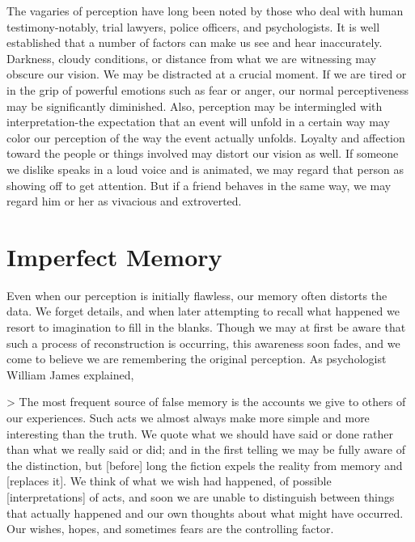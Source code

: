 \documentclass{book}
\begin{document}
The vagaries of perception have long been noted by those who deal with human testimony-notably, trial lawyers, police officers, and psychologists.  It is well established that a number of factors can make us see and hear inaccurately. Darkness, cloudy conditions, or distance from what we are witnessing may obscure our vision. We may be distracted at a crucial moment. If we are tired or in the grip of powerful emotions such as fear or anger, our normal perceptiveness may be significantly diminished.  Also, perception may be intermingled with interpretation-the expectation that an event will unfold in a certain way may color our perception of the way the event actually unfolds. Loyalty and affection toward the people or things involved may distort our vision as well. If someone we dislike speaks in a loud voice and is animated, we may regard that person as showing off to get attention. But if a friend behaves in the same way, we may regard him or her as vivacious and extroverted.

\section{Imperfect Memory}

Even when our perception is initially flawless, our memory often distorts the data. We forget details, and when later attempting to recall what happened we resort to imagination to fill in the blanks. Though we may at first be aware that such a process of reconstruction is occurring, this awareness soon fades, and we come to believe we are remembering the original perception. As psychologist William James explained,

> The most frequent source of false memory is the accounts we give to others of our experiences. Such acts we almost always make more simple and more interesting than the truth. We quote what we should have said or done rather than what we really said or did; and in the first telling we may be fully aware of the distinction, but [before] long the fiction expels the reality from memory and [replaces it]. We think of what we wish had happened, of possible [interpretations] of acts, and soon we are unable to distinguish between things that actually happened and our own thoughts about what might have occurred. Our wishes, hopes, and sometimes fears are the controlling factor.
\end{document}
